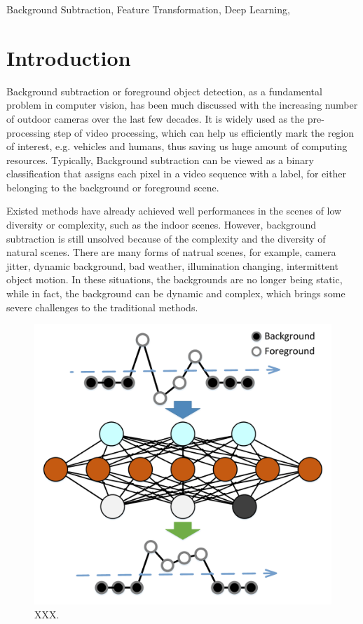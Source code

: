 \documentclass[journal]{IEEEtran}
\begin{document}
\begin{IEEEkeywords} 
    Background Subtraction, Feature Transformation, Deep Learning,
\end{IEEEkeywords}

\IEEEpeerreviewmaketitle

\section{Introduction}
Background subtraction or foreground object detection, as a fundamental problem in computer vision, has been much discussed with the increasing number of outdoor cameras over the last few decades.
It is widely used as the pre-processing step of video processing, which can help us efficiently mark the region of interest, e.g. vehicles and humans, thus saving us huge amount of computing resources.
Typically, Background subtraction can be viewed as a binary classification that assigns each pixel in a video sequence with a label, for either belonging to the background or foreground scene. 

Existed methods have already achieved well performances in the scenes of low diversity or complexity, such as the indoor scenes. However, background subtraction is still unsolved because of the complexity and the diversity of natural scenes.
There are many forms of natrual scenes, for example, camera jitter, dynamic background, bad weather, illumination changing, intermittent object motion. In these situations, the backgrounds are no longer being static, while in fact, the background can be dynamic and complex, which brings some severe challenges to the traditional methods.
\begin{figure}[!t]	%
\centering
    \includegraphics[width=\linewidth]{figure/idea.pdf}
    \caption{XXX.}
    \label{idea}
\end{figure}
\end{document}
